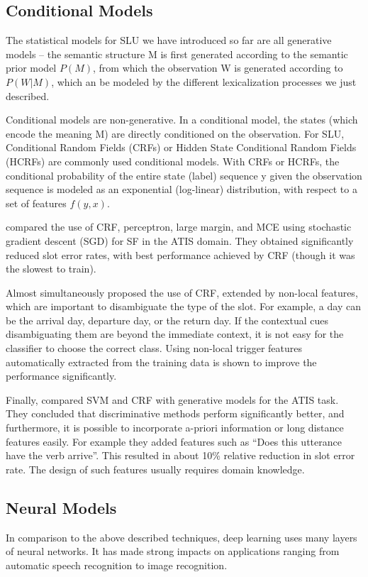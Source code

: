 \subsection{Conditional Models}
The statistical models for SLU we have introduced so far are all generative models – the
semantic structure M is first generated according to the semantic prior model $P(M)$, from
which the observation W is generated according to $P(W | M)$, which an be modeled by the
different lexicalization processes we just described.

Conditional models are non-generative. In a conditional model, the states (which encode
the meaning M) are directly conditioned on the observation. For SLU, Conditional Random
Fields (CRFs) or Hidden State Conditional Random Fields (HCRFs) are commonly used
conditional models. With CRFs or HCRFs, the conditional probability of the entire state
(label) sequence y given the observation sequence is modeled as an exponential (log-linear)
distribution, with respect to a set of features $f(y, x)$.

\cite{wang2006} compared the use of CRF, perceptron,
large margin, and MCE using stochastic gradient descent (SGD) for
SF in the ATIS domain. They obtained significantly reduced slot error
rates, with best performance achieved by CRF (though it was the
slowest to train).

Almost simultaneously \cite{dataset-flickr30k} proposed the use of
CRF, extended by non-local features, which are important to disambiguate
the type of the slot. For example, a day can be the arrival
day, departure day, or the return day. If the contextual cues disambiguating
them are beyond the immediate context, it is not easy for
the classifier to choose the correct class. Using non-local trigger
features automatically extracted from the training data is shown to
improve the performance significantly.

Finally, \cite{raymond} compared SVM and CRF
with generative models for the ATIS task. They concluded that discriminative
methods perform significantly better, and furthermore, it
is possible to incorporate a-priori information or long distance features
easily. For example they added features such as “Does this
utterance have the verb arrive”. This resulted in about 10\% relative
reduction in slot error rate. The design of such features usually
requires domain knowledge.

\subsection{Neural Models}
In comparison to the above described techniques, deep
learning uses many layers of neural networks. It has made
strong impacts on applications ranging from automatic speech
recognition to image recognition.

